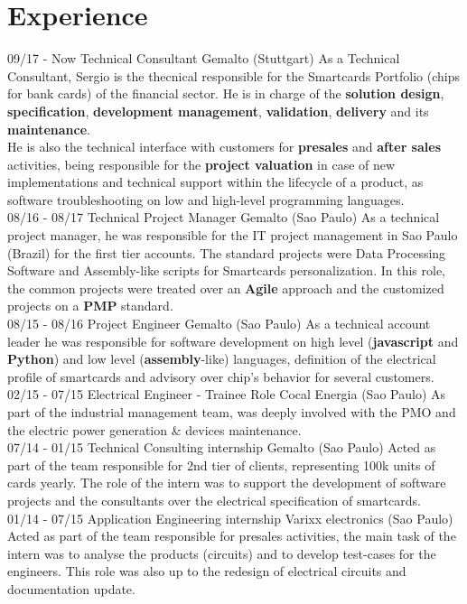 \documentclass[]{friggeri-cv}
\begin{document}
\section{Experience}
\begin{entrylist}
  \entry
    {09/17 - Now}
    {Technical Consultant}
    {\normalsize{Gemalto (Stuttgart)}}
    {As a Technical Consultant, Sergio is the thecnical responsible for the Smartcards Portfolio (chips for bank cards) of the financial sector. He is in charge of the \textbf{solution design},\textbf{ specification},\textbf{ development management},\textbf{ validation},\textbf{ delivery} and its\textbf{ maintenance}.\\ He is also the technical interface with customers for \textbf{presales} and \textbf{after sales} activities, being responsible for the \textbf{project valuation} in case of new implementations and technical support within the lifecycle of a product, as software troubleshooting on low and high-level programming languages.
     \\}
  \entry
    {08/16 - 08/17}
    {Technical Project Manager}
    {\normalsize{Gemalto (Sao Paulo)}}
    {As a technical project manager, he was responsible for the IT project management in Sao Paulo (Brazil) for the first tier accounts. The standard projects were Data Processing Software and Assembly-like scripts for Smartcards personalization. In this role, the common projects were treated over an \textbf{Agile} approach and the customized projects on a \textbf{PMP} standard.\\}
    \entry
    {08/15 - 08/16}
    {Project Engineer}
    {\normalsize{Gemalto (Sao Paulo)}}
    {As a technical account leader he was responsible for software development on high level (\textbf{javascript} and \textbf{Python}) and low level (\textbf{assembly}-like) languages, definition of the electrical profile of smartcards and advisory over chip's behavior for several customers. \\}
    \entry
    {02/15 - 07/15}
    {Electrical Engineer - Trainee Role}
    {\normalsize{Cocal Energia (Sao Paulo)}}
    {As part of the industrial management team, was deeply involved with the PMO and the electric power generation \& devices maintenance.
    \\}
    \entry
    {07/14 - 01/15}
    {Technical Consulting internship}
    {\normalsize{Gemalto (Sao Paulo)}}
    {Acted as part of the team responsible for 2nd tier of clients, representing 100k units of cards yearly. The role of the intern was to support the development of software projects and the consultants over the electrical specification of smartcards. \\}
    \entry
    {01/14 - 07/15}
    {Application Engineering internship}
    {\normalsize{Varixx electronics (Sao Paulo)}}
    {Acted as part of the team responsible for presales activities, the main task of the intern was to analyse the products (circuits) and to develop test-cases for the engineers. This role was also up to the redesign of electrical circuits and documentation update.\\}
\end{entrylist}
\newpage
\end{document}

